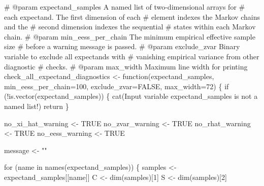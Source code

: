 \documentclass[
  letterpaper,
  DIV=11,
  numbers=noendperiod]{scrartcl}
\newenvironment{Shaded}{\begin{snugshade}}{\end{snugshade}}
\newcommand{\AttributeTok}[1]{\textcolor[rgb]{0.40,0.45,0.13}{#1}}
\newcommand{\CommentTok}[1]{\textcolor[rgb]{0.37,0.37,0.37}{#1}}
\newcommand{\ConstantTok}[1]{\textcolor[rgb]{0.56,0.35,0.01}{#1}}
\newcommand{\ControlFlowTok}[1]{\textcolor[rgb]{0.00,0.23,0.31}{#1}}
\newcommand{\DecValTok}[1]{\textcolor[rgb]{0.68,0.00,0.00}{#1}}
\newcommand{\FunctionTok}[1]{\textcolor[rgb]{0.28,0.35,0.67}{#1}}
\newcommand{\NormalTok}[1]{\textcolor[rgb]{0.00,0.23,0.31}{#1}}
\newcommand{\OtherTok}[1]{\textcolor[rgb]{0.00,0.23,0.31}{#1}}
\newcommand{\SpecialCharTok}[1]{\textcolor[rgb]{0.37,0.37,0.37}{#1}}
\newcommand{\StringTok}[1]{\textcolor[rgb]{0.13,0.47,0.30}{#1}}
\begin{document}
\begin{Shaded}
\begin{Highlighting}[]
\CommentTok{\# @param expectand\_samples A named list of two{-}dimensional arrays for }
\CommentTok{\#                          each expectand.  The first dimension of each}
\CommentTok{\#                          element indexes the Markov chains and the }
\CommentTok{\#                          second dimension indexes the sequential }
\CommentTok{\#                          states within each Markov chain.}
\CommentTok{\# @param min\_eess\_per\_chain The minimum empirical effective sample size}
\CommentTok{\#                           before a warning message is passed.}
\CommentTok{\# @param exclude\_zvar Binary variable to exclude all expectands with}
\CommentTok{\#                     vanishing empirical variance from other diagnostic}
\CommentTok{\#                     checks.}
\CommentTok{\# @param max\_width Maximum line width for printing}
\NormalTok{check\_all\_expectand\_diagnostics }\OtherTok{\textless{}{-}} \ControlFlowTok{function}\NormalTok{(expectand\_samples,}
                                            \AttributeTok{min\_eess\_per\_chain=}\DecValTok{100}\NormalTok{,}
                                            \AttributeTok{exclude\_zvar=}\ConstantTok{FALSE}\NormalTok{,}
                                            \AttributeTok{max\_width=}\DecValTok{72}\NormalTok{) \{}
  \ControlFlowTok{if}\NormalTok{ (}\SpecialCharTok{!}\FunctionTok{is.vector}\NormalTok{(expectand\_samples)) \{}
    \FunctionTok{cat}\NormalTok{(}\StringTok{\textquotesingle{}Input variable \textasciigrave{}expectand\_samples\textasciigrave{} is not a named list!\textquotesingle{}}\NormalTok{)}
\NormalTok{    return}
\NormalTok{  \}}
  
\NormalTok{  no\_xi\_hat\_warning }\OtherTok{\textless{}{-}} \ConstantTok{TRUE}
\NormalTok{  no\_zvar\_warning }\OtherTok{\textless{}{-}} \ConstantTok{TRUE}
\NormalTok{  no\_rhat\_warning }\OtherTok{\textless{}{-}} \ConstantTok{TRUE}
\NormalTok{  no\_eess\_warning }\OtherTok{\textless{}{-}} \ConstantTok{TRUE}

\NormalTok{  message }\OtherTok{\textless{}{-}} \StringTok{""}

  \ControlFlowTok{for}\NormalTok{ (name }\ControlFlowTok{in} \FunctionTok{names}\NormalTok{(expectand\_samples)) \{}
\NormalTok{    samples }\OtherTok{\textless{}{-}}\NormalTok{ expectand\_samples[[name]]}
\NormalTok{    C }\OtherTok{\textless{}{-}} \FunctionTok{dim}\NormalTok{(samples)[}\DecValTok{1}\NormalTok{]}
\NormalTok{    S }\OtherTok{\textless{}{-}} \FunctionTok{dim}\NormalTok{(samples)[}\DecValTok{2}\NormalTok{]}
    

\end{Highlighting}
\end{Shaded}
\end{document}
